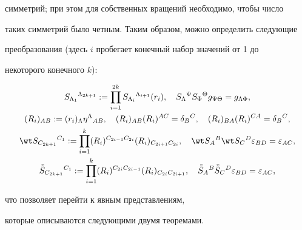 симметрий; при этом для собственных вращений необходимо, чтобы число


таких симметрий было четным. Таким образом, можно определить следующие


преобразования (здесь $i$ пробегает конечный набор значений от 1 до


некоторого конечного $k$):


\begin{gather*}




S_{\Lambda_1}{}^{\Lambda_{2k+1}}:=


\prod_{i=1}^{2k} S_{\Lambda_i}{}^{\Lambda_{i+1}} (r_i),\quad


S_\Lambda{}^\Psi S_\Phi{}^\Theta g_{\Psi\Theta}=g_{\Lambda\Phi}, \\


%


(R_i){}_{AB}:=(r_i)_\Lambda\eta^\Lambda{}_{AB},\quad


(R_i)_{AB} (R_i)^{AC} =\delta_B{}^C,\quad


(R_i)_{BA} (R_i)^{CA} =\delta_B{}^C, \\


%


\wt S_{C_{2k+1}}{}^{C_1}:=\prod_{i=1}^{k}


(R_i)^{C_{2i-1}C_{2i}}(R_i)_{C_{2i+1}C_{2i}},\quad


\wt S_A{}^B \wt S_C{}^D \varepsilon_{BD}=\varepsilon_{AC}, \\


%


\Tilde{\Tilde S}_{C_{2k+1}}{}^{C_1}:=\prod_{i=1}^{k}


(R_i)^{C_{2i}C_{2i-1}}(R_i)_{{C_{2i}C_{2i+1}}},\quad


\Tilde{\Tilde S}_A{}^B \Tilde{\Tilde S}_C{}^D \varepsilon_{BD}=


\varepsilon_{AC},


\end{gather*}


что позволяет перейти к явным представлениям,


которые описываются следующими двумя теоремами.





